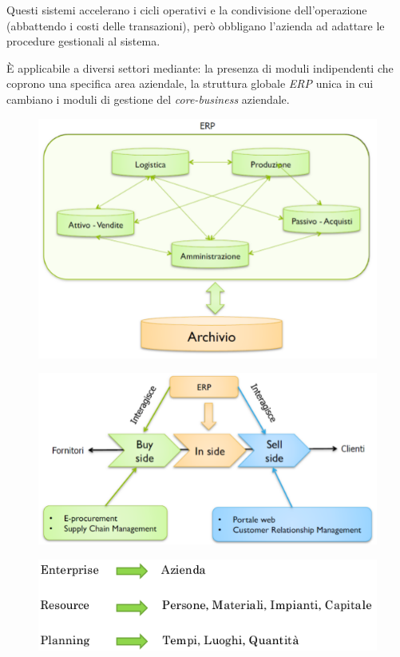 \documentclass[a4paper, notitlepage, 9pt]{extreport}
\begin{document}
Questi sistemi accelerano i cicli operativi e la condivisione dell'operazione (abbattendo i costi delle transazioni), però obbligano l’azienda ad adattare le procedure gestionali al sistema.

\MakeUppercase{è} applicabile a diversi settori mediante: la presenza di moduli indipendenti che coprono una specifica area aziendale, la struttura globale \textit{ERP} unica in cui cambiano i moduli di gestione del \textit{core-business} aziendale.
\begin{multicols}{2}
	\begin{figure}[H]
		\centering
		\includegraphics[scale=0.33]{ERP3}
	\end{figure}
\columnbreak
	\begin{figure}[H]
		\centering
		\includegraphics[scale=0.33]{ERP2}
	\end{figure}
	\begin{figure}[H]
		\centering
		\includegraphics[scale=0.26]{ERP}
	\end{figure}
\end{multicols}
\end{document}
